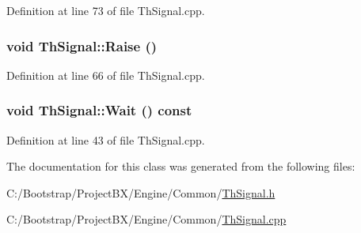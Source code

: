 Definition at line 73 of file ThSignal.cpp.\hypertarget{class_th_signal_8609e6122614a6b3fac9ec6185008b7a}{
\subsubsection[{Raise}]{\setlength{\rightskip}{0pt plus 5cm}void ThSignal::Raise ()}}
\label{class_th_signal_8609e6122614a6b3fac9ec6185008b7a}




Definition at line 66 of file ThSignal.cpp.\hypertarget{class_th_signal_10bb9c646beb4ae8d7fe3e468ab513b0}{
\subsubsection[{Wait}]{\setlength{\rightskip}{0pt plus 5cm}void ThSignal::Wait () const}}
\label{class_th_signal_10bb9c646beb4ae8d7fe3e468ab513b0}




Definition at line 43 of file ThSignal.cpp.

The documentation for this class was generated from the following files:\begin{CompactItemize}
\item 
C:/Bootstrap/ProjectBX/Engine/Common/\hyperlink{_th_signal_8h}{ThSignal.h}\item 
C:/Bootstrap/ProjectBX/Engine/Common/\hyperlink{_th_signal_8cpp}{ThSignal.cpp}\end{CompactItemize}
